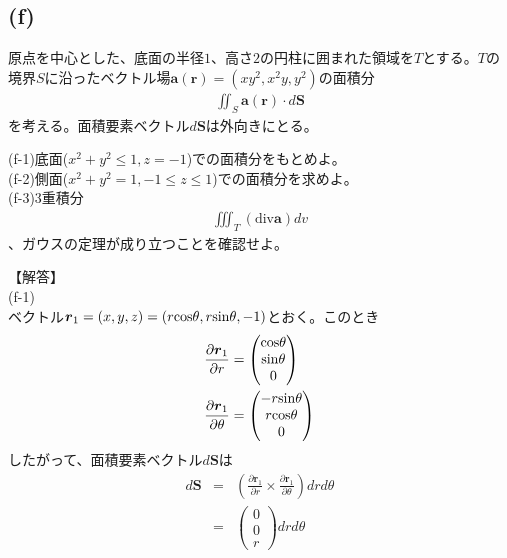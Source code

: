 \documentclass[pdflatex,ja=standard,fleqn]{bxjsarticle}
\begin{document}
\subsection*{(f)}
\begin{screen}
    原点を中心とした、底面の半径$1$、高さ$2$の円柱に囲まれた領域を$T$とする。$T$の境界$S$に沿ったベクトル場$\boldsymbol{a}(\boldsymbol{r})=(xy^2,x^2y,y^2)$の面積分
    \begin{eqnarray*}
        \iint_S \boldsymbol{a}(\boldsymbol{r})\cdot d\boldsymbol{S}
    \end{eqnarray*}
    を考える。面積要素ベクトル$d\boldsymbol{S}$は外向きにとる。\par
    (f-1)底面($x^2+y^2\leq1,z=-1$)での面積分をもとめよ。\\
    (f-2)側面($x^2+y^2=1,-1\leq z\leq1$)での面積分を求めよ。\\
    (f-3)3重積分
    \begin{eqnarray*}
        \iiint_T (\mathrm{div}\boldsymbol{a})dv
    \end{eqnarray*}
    、ガウスの定理が成り立つことを確認せよ。
\end{screen}
【解答】\\
(f-1)\\
ベクトル$\boldsymbol{r}_{1}=(x,y,z)=(r{\rm cos}\theta,r{\rm sin}\theta,-1)$とおく。このとき
\begin{align*}
    &\frac{\partial \boldsymbol{r}_{1}}{\partial r}=\begin{pmatrix}{\rm cos}\theta\\{\rm sin}\theta\\0\end{pmatrix}\\
    &\frac{\partial \boldsymbol{r}_{1}}{\partial \theta}=\begin{pmatrix}-r{\rm sin}\theta\\r{\rm cos}\theta\\0\end{pmatrix}
\end{align*}
したがって、面積要素ベクトル$d\boldsymbol{S}$は
\begin{eqnarray*}
    d\boldsymbol{S}&=&\left(\frac{\partial \boldsymbol{r}_{1}}{\partial r}\times\frac{\partial \boldsymbol{r}_{1}}{\partial \theta}\right)drd\theta\\
    &=&\begin{pmatrix}0\\0\\r\end{pmatrix}drd\theta
\end{eqnarray*}
\end{document}
